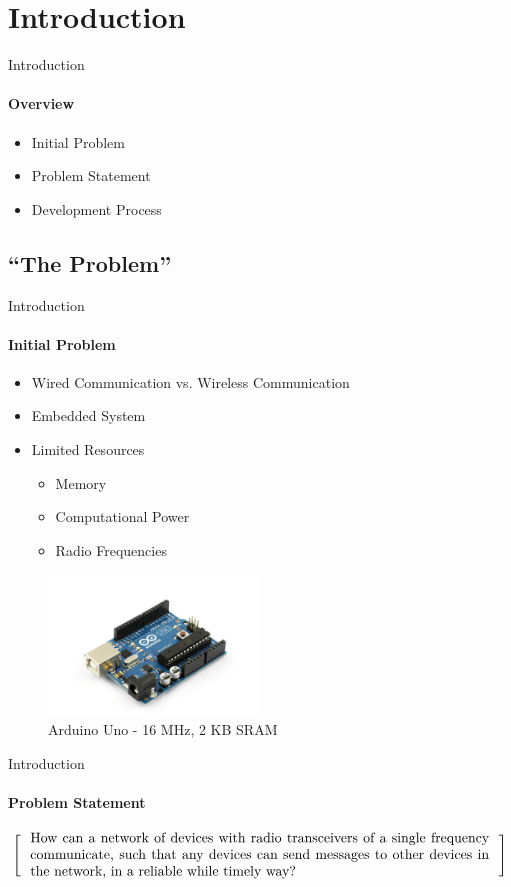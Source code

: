 \section{Introduction}
\begin{frame}{Introduction}\framesubtitle{Overview}
    \begin{itemize}
        \item Initial Problem
        \item Problem Statement
        \item Development Process 
    \end{itemize}
\end{frame}
\subsection{``The Problem''}
\begin{frame}[t]{Introduction}\framesubtitle{Initial Problem}
	\begin{itemize}
        \item Wired Communication vs. Wireless Communication
        \item Embedded System 
        \item Limited Resources
            \begin{itemize}
                \item Memory
                \item Computational Power
                \item Radio Frequencies
            \end{itemize}
    \end{itemize}
    \begin{figure}
        \includegraphics[width=0.5\textwidth,trim={3cm 0.5cm 3cm 3cm},clip]{images/arduino_uno.jpg}
        \caption{Arduino Uno - 16 MHz, 2 KB SRAM}
    \end{figure}
\end{frame}
\begin{frame}{Introduction}\framesubtitle{Problem Statement}
\[
\left[
\begin{minipage}{\textwidth}
\centering
\begin{minipage}{0.96\textwidth}
How can a network of devices with radio transceivers of a single frequency communicate, such that any devices can send messages to other devices in the network, in a reliable while timely way?
\end{minipage}
\end{minipage}
\right]
\]
\end{frame}
